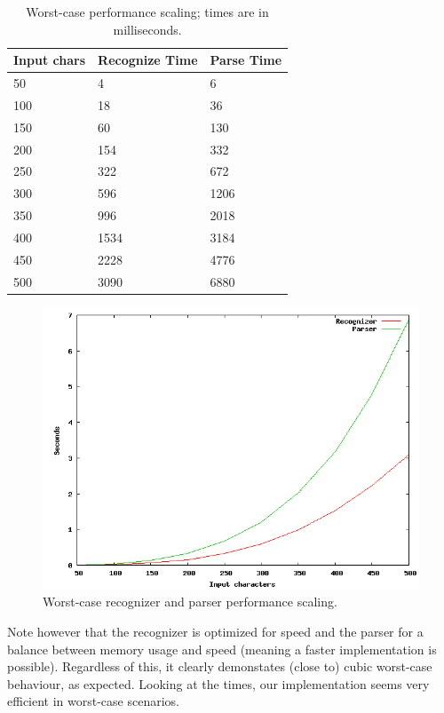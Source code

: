 \documentclass[a4paper,10pt]{article}
\begin{document}
\begin{table}[H]
\centering
\begin{tabular}{ | p{5em} | p{7em} | p{6em} | }
  \hline
  Input chars & Recognize Time & Parse Time \\
  \hline
  50 & 4 & 6 \\
  100 & 18 & 36 \\
  150 & 60 & 130 \\
  200 & 154 & 332 \\
  250 & 322 & 672 \\
  300 & 596 & 1206 \\
  350 & 996 & 2018 \\
  400 & 1534 & 3184 \\
  450 & 2228 & 4776 \\
  500 & 3090 & 6880 \\
  \hline
\end{tabular}
\caption{Worst-case performance scaling; times are in milliseconds.}
\end{table}

\begin{figure}[H]
\centering
\includegraphics[scale=0.5]{worst-case.png}
\caption{Worst-case recognizer and parser performance scaling.}
\end{figure}

Note however that the recognizer is optimized for speed and the parser for a balance between memory usage and speed (meaning a faster implementation is possible). Regardless of this, it clearly demonstates (close to) cubic worst-case behaviour, as expected. Looking at the times, our implementation seems very efficient in worst-case scenarios.
\end{document}

